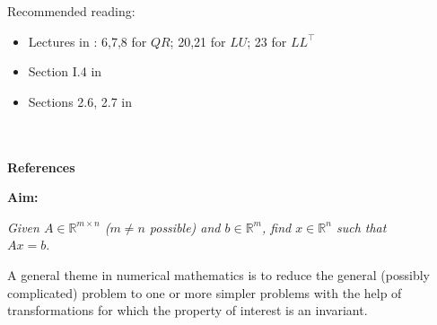 

\begin{frame}
	Recommended reading:\\
	\begin{itemize}
		\item Lectures in \cite{TreBau}: 6,7,8 for $QR$; 20,21 for $LU$; 23 for $LL^\top$
		\item Section I.4 in \cite{StrangData}
		\item Sections 2.6, 2.7 in \cite{StrangLA_intro}
	\end{itemize}
	~\\~\\
	\textbf{References}
	
	
\end{frame}

\begin{frame}
	
	
	\textbf{Aim:}
		\begin{center}
		\textit{	Given $A\in\mathbb{R}^{m\times n}$ ($m\neq n$ possible) and $b\in\mathbb{R}^m$,
			find $x\in\mathbb{R}^n$ such that\\
			$Ax=b.$}
	\end{center}
A general theme in numerical mathematics is to reduce the general (possibly complicated) problem to one or more simpler problems with the help of transformations for which the property of interest is an invariant.\\~\\\small
{}
\end{frame}
